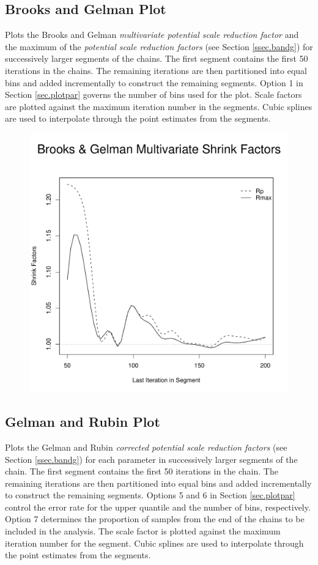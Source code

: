 \documentclass[12pt,letterpaper]{report}
\begin{document}
\subsection{Brooks and Gelman Plot}
\noindent
Plots the Brooks and Gelman {\it multivariate potential scale reduction factor}
and the maximum of the {\it potential scale reduction factors} (see Section
\ref{ssec.bandg}) for successively larger segments of the chains. The first
segment contains the first 50 iterations in the chains. The remaining iterations
are then partitioned into equal bins and added incrementally to construct the
remaining segments. Option 1 in Section \ref{sec.plotpar} governs the number
of bins used for the plot. Scale factors are plotted against the maximum
iteration number in the segments. Cubic splines are used to interpolate through
the point estimates from the segments.

\begin{figure}[h]
\centering
\includegraphics[keepaspectratio,width=5in]{bandg.pdf}
\end{figure}

\pagebreak

\subsection{Gelman and Rubin Plot}
\noindent
Plots the Gelman and Rubin {\it corrected potential scale reduction factors}
(see Section \ref{ssec.bandg}) for each parameter in successively larger
segments of the chain. The first segment contains the first 50 iterations in the
chain. The remaining iterations are then partitioned into equal bins and added
incrementally to construct the remaining segments. Options 5 and 6 in Section
\ref{sec.plotpar} control the error rate for the upper quantile and the number
of bins, respectively. Option 7 determines the proportion of samples from the
end of the chains to be included in the analysis. The scale factor is plotted
against the maximum iteration number for the segment. Cubic splines are used to
interpolate through the point estimates from the segments.
\end{document}

